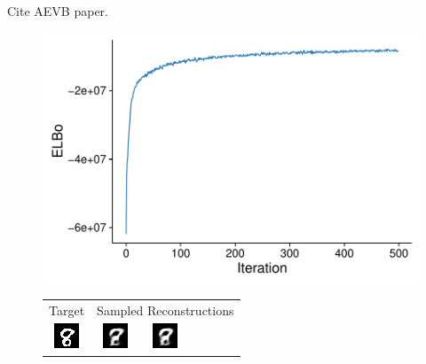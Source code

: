 Cite AEVB paper.

\begin{figure}
\begin{minipage}{0.5\linewidth}
\centering
\includegraphics[width=\linewidth]{figs/results/vae/elboProgress.pdf}
\end{minipage}
%
\hspace{2em}
%
\begin{minipage}{0.5\linewidth}
\setlength{\tabcolsep}{1pt}
\centering
\begin{tabular}{c  c c c c c}
Target & \multicolumn{5}{c}{Sampled Reconstructions}
\\
 \includegraphics[width=0.16\linewidth]{figs/results/vae/vae_encodeDecode_target_000.png}\hspace{4pt}
& \includegraphics[width=0.16\linewidth]{figs/results/vae/vae_encodeDecode_target_000_sample_001.png}
& \includegraphics[width=0.16\linewidth]{figs/results/vae/vae_encodeDecode_target_000_sample_002.png}

\end{tabular}
\end{minipage}
\end{figure}
